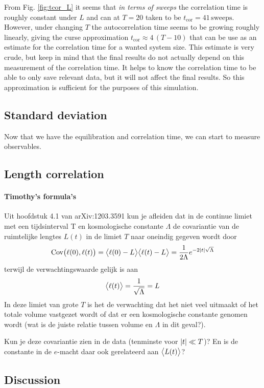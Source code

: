 From Fig. \ref{fig:tcor_L} it seems that \emph{in terms of sweeps} the correlation time is roughly constant under $L$ and can at $T = 20$ taken to be $t_\text{cor} = 41 \, \text{sweeps}$.
However, under changing $T$ the autocorrelation time seems to be growing roughly linearly, giving the curse approximation $t_\text{cor} \approx 4\, (T - 10)$ that can be use as an estimate for the correlation time for a wanted system size.
This estimate is very crude, but keep in mind that the final results do not actually depend on this measurement of the correlation time. It helps to know the correlation time to be able to only save relevant data, but it will not affect the final results.
So this approximation is sufficient for the purposes of this simulation.

\subsection{Standard deviation}
Now that we have the equilibration and correlation time, we can start to measure observables.

\subsection{Length correlation}
\paragraph{Timothy's formula's}
Uit hoofdstuk 4.1 van arXiv:1203.3591 kun je afleiden dat in de continue
limiet met een tijdsinterval T en kosmologische constante $\Lambda$ de
covariantie van de ruimtelijke lengtes $L(t)$ in de limiet $T$ naar oneindig gegeven wordt door
\begin{equation}
    \text{Cov}\big(\ell(0), \ell(t)\big) = \big\langle \ell(0) - L \big\rangle \big\langle \ell(t) - L \big\rangle
    = \frac{1}{2\Lambda} e^{- 2\abs{t}\sqrt{\Lambda}}
\end{equation}
terwijl de verwachtingswaarde gelijk is aan
\begin{equation}
    \big\langle \ell(t) \big\rangle = \frac{1}{\sqrt{\Lambda}} = L
\end{equation}
In deze limiet van grote $T$ is het de verwachting dat het niet veel
uitmaakt of het totale volume vastgezet wordt of dat er een
kosmologische constante genomen wordt (wat is de juiste relatie tussen
volume en $\Lambda$ in dit geval?).

Kun je deze covariantie zien in de data (tenminste voor $\abs{t} \ll T$)? En is
de constante in de $e$-macht daar ook gerelateerd aan $\big\langle L(t) \big\rangle$?



\subsection{Discussion}
